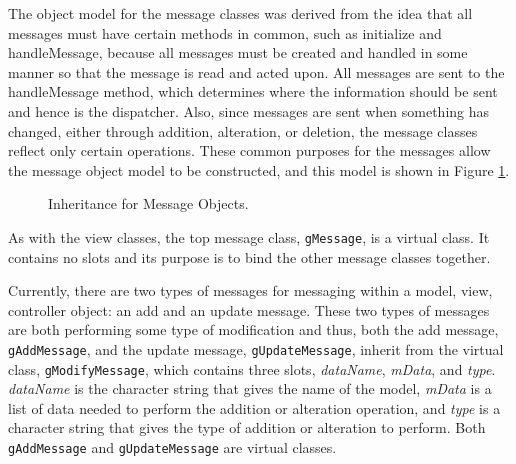 \documentclass{article}[11pt]
\newcommand{\Rfunction}[1]{{\textsf{#1}}}
\newcommand{\Rslot}[1]{\textsl{#1}}
\newcommand{\Rclass}[1]{\texttt{#1}}
\begin{document}
The object model for the message classes was derived from the idea
that all messages must have certain methods in common, such as
\Rfunction{initialize} and \Rfunction{handleMessage}, because all
messages must be created and handled in some manner so that the
message is read and acted upon.  All messages are sent to
the \Rfunction{handleMessage} method, which determines where the information
should be sent and hence is the dispatcher.   Also, since messages
are sent when something has changed, either through addition, alteration, or
deletion, the message classes reflect only certain operations.  These
common purposes for the messages allow the message object
model to be constructed, and this model is shown in Figure \ref{Fig:Mess}.

\begin{figure}[ht]
  \begin{center}
    \caption{ Inheritance for Message Objects. }
    \label{Fig:Mess}
  \end{center}
\end{figure}

As with the view classes, the top message class,
\Rclass{gMessage}, is a virtual class.  It contains no slots and its purpose
is to bind the other message classes together.

Currently, there are two types of messages for messaging within a
model, view, controller object: an add and an update message.  These two types
of messages are both performing some type of modification and thus, both the
add message, \Rclass{gAddMessage}, and the update message,
\Rclass{gUpdateMessage}, inherit from the virtual class,
\Rclass{gModifyMessage}, which contains three slots, \Rslot{dataName},
\Rslot{mData}, and \Rslot{type}.  \Rslot{dataName} is the character string
that gives the name of the model, 
\Rslot{mData} is a list of data needed to perform the addition or alteration
operation, and \Rslot{type} is a character string that gives the type of
addition or alteration to perform.  Both \Rclass{gAddMessage} and
\Rclass{gUpdateMessage} are virtual classes. 
\end{document}
